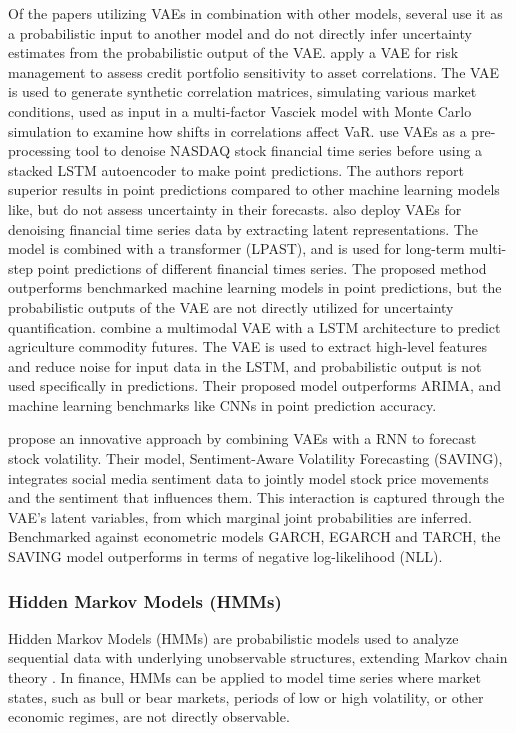 Of the papers utilizing VAEs in combination with other models, several use it as a probabilistic input to another model and do not directly infer uncertainty estimates from the probabilistic output of the VAE.  
\textcite{caprioli2023quantifying} apply a VAE for risk management to assess credit portfolio sensitivity to asset correlations. The VAE is used to generate synthetic correlation matrices, simulating various market conditions, used as input in a multi-factor Vasciek model with Monte Carlo simulation to examine how shifts in correlations affect VaR. \textcite{choudhury2020enhancing} use VAEs as a pre-processing tool to denoise NASDAQ stock financial time series before using a stacked LSTM autoencoder to make point predictions. The authors report superior results in point predictions compared to other machine learning models like, but do not assess uncertainty in their forecasts. \textcite{tang2024period} also deploy VAEs for denoising financial time series data by extracting latent representations. The model is combined with a transformer (LPAST), and is used for long-term multi-step point predictions of different financial times series. The proposed method outperforms benchmarked machine learning models in point predictions, but the probabilistic outputs of the VAE are not directly utilized for uncertainty quantification. \textcite{li2020multivariate} combine a multimodal VAE with a LSTM architecture to predict agriculture commodity futures. The VAE is used to extract high-level features and reduce noise for input data in the LSTM, and probabilistic output is not used specifically in predictions. Their proposed model outperforms ARIMA, and machine learning benchmarks like CNNs in point prediction accuracy. 

\textcite{xing2019sentiment} propose an innovative approach by combining VAEs with a RNN to forecast stock volatility. Their model, Sentiment-Aware Volatility Forecasting (SAVING), integrates social media sentiment data to jointly model stock price movements and the sentiment that influences them. This interaction is captured through the VAE's latent variables, from which marginal joint probabilities are inferred. Benchmarked against econometric models GARCH, EGARCH and TARCH, the SAVING model outperforms in terms of negative log-likelihood (NLL).


\subsubsection{Hidden Markov Models (HMMs)}
Hidden Markov Models (HMMs) are probabilistic models used to analyze sequential data with underlying unobservable structures, extending Markov chain theory \parencite{Rabiner1989hmm}. In finance, HMMs can be applied to model time series where market states, such as bull or bear markets, periods of low or high volatility, or other economic regimes, are not directly observable. 

